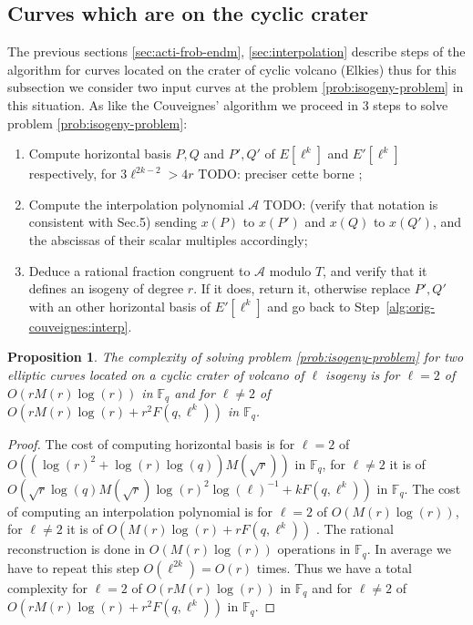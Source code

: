 \documentclass{lms}
\newcommand{\todo}[1]{{\color{red}TODO: #1}}
\newtheorem{prop}[thm]{Proposition}
\begin{document}
 \subsection{Curves which are on the cyclic crater}
  The previous sections \ref{sec:acti-frob-endm}, \ref{sec:interpolation} describe steps of the algorithm for curves located on the crater of cyclic volcano (Elkies) thus for this subsection we consider two input curves at the problem \ref{prob:isogeny-problem} in this situation. As like the Couveignes' algorithm we proceed in 3 steps to solve problem \ref{prob:isogeny-problem}:
 \begin{enumerate}
\item Compute horizontal basis $P,Q$ and $P',Q'$ of
  $E[\ell^k]$ and $E'[\ell^k]$ respectively, for $3\ell^{2k-2} > 4r$ \todo{preciser cette borne} ;
\item\label{alg:modif-couveignes:interp} Compute the interpolation
  polynomial $\mathcal{A}$ \todo{(verify that notation is consistent
    with Sec.5)} sending $x(P)$ to $x(P')$ and $x(Q)$ to $x(Q')$, and the abscissas of
  their scalar multiples accordingly;
\item\label{alg:modif-couveignes:rational} Deduce a rational fraction
  congruent to $\mathcal{A}$ modulo $T$, and verify that it
  defines an isogeny of degree $r$. If it does, return it, otherwise
  replace $P',Q'$ with an other horizontal basis of $E'[\ell^k]$ and go back to
  Step~\ref{alg:orig-couveignes:interp}.
\end{enumerate} 

\begin{prop}
The complexity of solving problem \ref{prob:isogeny-problem} for two elliptic curves located on a cyclic crater of volcano of $\ell$ isogeny is for $\ell=2$ of $O(rM(r)\log(r))$ in $\mathbb{F}_q$ and for $\ell \neq 2$ of $O(rM(r)\log(r)+r^2F(q,\ell^k))$ in $\mathbb{F}_q$.
\end{prop}

\begin{proof}
The cost of computing horizontal basis is for $\ell=2$ of $O((\log(r)^2+\log(r)\log(q))M(\sqrt{r}))$ in $\mathbb{F}_q$, for $\ell \neq 2$ it is of $O(\sqrt{r}\log(q)M(\sqrt{r})\log(r)^2 \log(\ell)^{-1}+kF(q,\ell^k))$ in $\mathbb{F}_q$.
The cost of computing an interpolation polynomial is for $\ell=2$ of $O(M(r)\log(r))$, for $\ell \neq 2$ it is of $O(M(r)\log(r)+rF(q,\ell^k))$ . The rational reconstruction is done in $O(M(r)\log(r))$ operations in $\mathbb{F}_q$. In average we have to repeat this step $O(\ell^{2k})=O(r)$ times. 
Thus we have a total complexity for $\ell=2$ of  $O(rM(r)\log(r))$ in $\mathbb{F}_q$ and for $\ell \neq 2$ of $O(rM(r)\log(r)+r^2F(q,\ell^k))$ in $\mathbb{F}_q$.
\end{proof}
  
\end{document}
